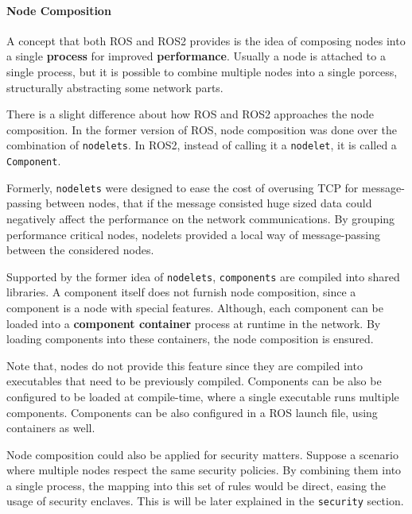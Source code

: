 \paragraph{Node Composition}
               
A concept that both ROS and ROS2 provides is the idea of composing nodes into a single \textbf{process} for improved \textbf{performance}. Usually a node is attached to a single process, but it is possible to combine multiple nodes into a single porcess, structurally abstracting some network parts. 

There is a slight difference about how ROS and ROS2 approaches the node composition. In the former version of ROS, node composition was done over the combination of \texttt{nodelets}. In ROS2, instead of calling it a \texttt{nodelet}, it is called a \texttt{Component}. 

Formerly, \texttt{nodelets} were designed to ease the cost of overusing TCP for message-passing between nodes, that if the message consisted huge sized data could negatively affect the performance on the network communications. By grouping performance critical nodes, nodelets provided a local way of message-passing between the considered nodes.

Supported by the former idea of \texttt{nodelets}, \texttt{components} are compiled into shared libraries. A component itself does not furnish node composition, since a component is a node with special features. Although,  each component can be loaded into a \textbf{component container} process at runtime in the network. By loading components into these containers, the node composition is ensured. 
 
Note that, nodes do not provide this feature since they are compiled into executables that need to be previously compiled. Components can be also be configured to be loaded at compile-time, where a single executable runs multiple components. Components can be also configured in a ROS launch file, using containers as well.
 
Node composition could also be applied for security matters. Suppose a scenario where multiple nodes respect the same security policies. By combining them into a single process, the mapping into this set of rules would be direct, easing the usage of security enclaves. %
This is will be later explained in the \texttt{security} section.
               

